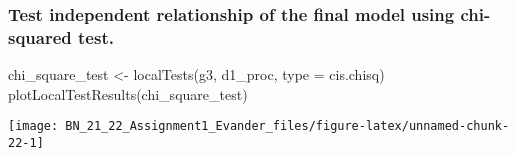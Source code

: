 \documentclass[
]{article}
\newenvironment{Shaded}{\begin{snugshade}}{\end{snugshade}}
\newcommand{\AttributeTok}[1]{\textcolor[rgb]{0.77,0.63,0.00}{#1}}
\newcommand{\ConstantTok}[1]{\textcolor[rgb]{0.00,0.00,0.00}{#1}}
\newcommand{\DecValTok}[1]{\textcolor[rgb]{0.00,0.00,0.81}{#1}}
\newcommand{\FunctionTok}[1]{\textcolor[rgb]{0.00,0.00,0.00}{#1}}
\newcommand{\NormalTok}[1]{#1}
\newcommand{\OtherTok}[1]{\textcolor[rgb]{0.56,0.35,0.01}{#1}}
\newcommand{\SpecialCharTok}[1]{\textcolor[rgb]{0.00,0.00,0.00}{#1}}
\newcommand{\StringTok}[1]{\textcolor[rgb]{0.31,0.60,0.02}{#1}}
\begin{document}
\newpage

\hypertarget{test-independent-relationship-of-the-final-model-using-chi-squared-test.}{%
\subsubsection{Test independent relationship of the final model using
chi-squared
test.}\label{test-independent-relationship-of-the-final-model-using-chi-squared-test.}}

\begin{Shaded}
\begin{Highlighting}[]
\NormalTok{chi\_square\_test }\OtherTok{\textless{}{-}} \FunctionTok{localTests}\NormalTok{(g3, d1\_proc, }\AttributeTok{type =} \StringTok{\textquotesingle{}cis.chisq\textquotesingle{}}\NormalTok{)}
\FunctionTok{plotLocalTestResults}\NormalTok{(chi\_square\_test)}
\end{Highlighting}
\end{Shaded}

\begin{center}\texttt{[image: BN\_21\_22\_Assignment1\_Evander\_files/figure-latex/unnamed-chunk-22-1]} \end{center}

\begin{Shaded}
\end{Shaded}
\end{document}
